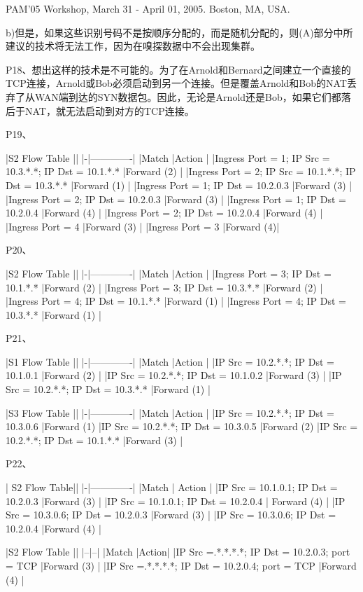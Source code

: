 \documentclass[11pt,UTF8,twoside]{article}
\begin{document}
	PAM'05 Workshop, March 31 - April 01, 2005. Boston, MA, USA. 
	
	
	b)但是，如果这些识别号码不是按顺序分配的，而是随机分配的，则(A)部分中所建议的技术将无法工作，因为在嗅探数据中不会出现集群。
	
	P18、想出这样的技术是不可能的。为了在Arnold和Bernard之间建立一个直接的TCP连接，Arnold或Bob必须启动到另一个连接。但是覆盖Arnold和Bob的NAT丢弃了从WAN端到达的SYN数据包。因此，无论是Arnold还是Bob，如果它们都落后于NAT，就无法启动到对方的TCP连接。
	
	P19、
	
	|S2 Flow Table ||
	|-|-------------|
	|Match |Action |
	|Ingress Port = 1; IP Src = 10.3.*.*; IP Dst = 10.1.*.* |Forward (2) |
	|Ingress Port = 2; IP Src = 10.1.*.*; IP Dst = 10.3.*.* |Forward (1) |
	|Ingress Port = 1; IP Dst = 10.2.0.3 |Forward (3) |
	|Ingress Port = 2; IP Dst = 10.2.0.3 |Forward (3) |
	|Ingress Port = 1; IP Dst = 10.2.0.4 |Forward (4) |
	|Ingress Port = 2; IP Dst = 10.2.0.4 |Forward (4) |
	|Ingress Port = 4 |Forward (3) |
	|Ingress Port = 3 |Forward (4)|
	
	P20、
	
	|S2 Flow Table ||
	|-|-------------|
	|Match |Action |
	|Ingress Port = 3; IP Dst = 10.1.*.* |Forward (2) |
	|Ingress Port = 3; IP Dst = 10.3.*.* |Forward (2) |
	|Ingress Port = 4; IP Dst = 10.1.*.* |Forward (1) |
	|Ingress Port = 4; IP Dst = 10.3.*.* |Forward (1) |
	
	P21、
	
	|S1 Flow Table ||
	|-|-------------|
	|Match |Action |
	|IP Src = 10.2.*.*; IP Dst = 10.1.0.1 |Forward (2) |
	|IP Src = 10.2.*.*; IP Dst = 10.1.0.2 |Forward (3) |
	|IP Src = 10.2.*.*; IP Dst = 10.3.*.* |Forward (1) |
	
	|S3 Flow Table ||
	|-|-------------|
	|Match |Action |
	|IP Src = 10.2.*.*; IP Dst = 10.3.0.6 |Forward (1) 
	|IP Src = 10.2.*.*; IP Dst = 10.3.0.5 |Forward (2) 
	|IP Src = 10.2.*.*; IP Dst = 10.1.*.* |Forward (3) |
	
	
	P22、
	
	| S2 Flow Table||
	|-|-------------| 
	|Match | Action |
	|IP Src = 10.1.0.1; IP Dst = 10.2.0.3 |Forward (3) |
	|IP Src = 10.1.0.1; IP Dst = 10.2.0.4 | Forward (4) |
	|IP Src = 10.3.0.6; IP Dst = 10.2.0.3 |Forward (3) |
	|IP Src = 10.3.0.6; IP Dst = 10.2.0.4 |Forward (4) |
	
	|S2 Flow Table ||
	|--|--|
	|Match |Action| 
	|IP Src =.*.*.*.*; IP Dst = 10.2.0.3; port = TCP |Forward (3) |
	|IP Src =.*.*.*.*; IP Dst = 10.2.0.4; port = TCP |Forward (4) |
	
\end{document}
